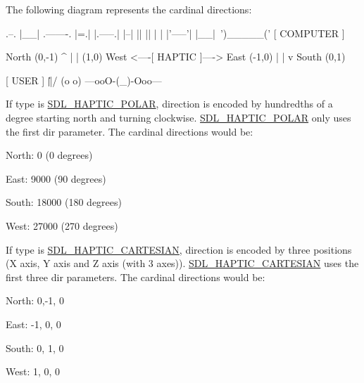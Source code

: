 The following diagram represents the cardinal directions\-: \begin{DoxyVerb}                .--.
                |__| .-------.
                |=.| |.-----.|
                |--| ||     ||
                |  | |'-----'|
                |__|~')_____('
                  [ COMPUTER ]


                    North (0,-1)
                        ^
                        |
                        |
   (1,0)  West <----[ HAPTIC ]----> East (-1,0)
                        |
                        |
                        v
                     South (0,1)


                     [ USER ]
                       \|||/
                       (o o)
                 ---ooO-(_)-Ooo---\end{DoxyVerb}


If type is \hyperlink{_s_d_l__haptic_8h_acdc35e97e5525472054a67b76e518f3b}{S\-D\-L\-\_\-\-H\-A\-P\-T\-I\-C\-\_\-\-P\-O\-L\-A\-R}, direction is encoded by hundredths of a degree starting north and turning clockwise. \hyperlink{_s_d_l__haptic_8h_acdc35e97e5525472054a67b76e518f3b}{S\-D\-L\-\_\-\-H\-A\-P\-T\-I\-C\-\_\-\-P\-O\-L\-A\-R} only uses the first {\ttfamily dir} parameter. The cardinal directions would be\-:
\begin{DoxyItemize}
\item North\-: 0 (0 degrees)
\item East\-: 9000 (90 degrees)
\item South\-: 18000 (180 degrees)
\item West\-: 27000 (270 degrees)
\end{DoxyItemize}

If type is \hyperlink{_s_d_l__haptic_8h_af8b2430a363a968de2a5b64c8f663d3b}{S\-D\-L\-\_\-\-H\-A\-P\-T\-I\-C\-\_\-\-C\-A\-R\-T\-E\-S\-I\-A\-N}, direction is encoded by three positions (X axis, Y axis and Z axis (with 3 axes)). \hyperlink{_s_d_l__haptic_8h_af8b2430a363a968de2a5b64c8f663d3b}{S\-D\-L\-\_\-\-H\-A\-P\-T\-I\-C\-\_\-\-C\-A\-R\-T\-E\-S\-I\-A\-N} uses the first three {\ttfamily dir} parameters. The cardinal directions would be\-:
\begin{DoxyItemize}
\item North\-: 0,-\/1, 0
\item East\-: -\/1, 0, 0
\item South\-: 0, 1, 0
\item West\-: 1, 0, 0
\end{DoxyItemize}


